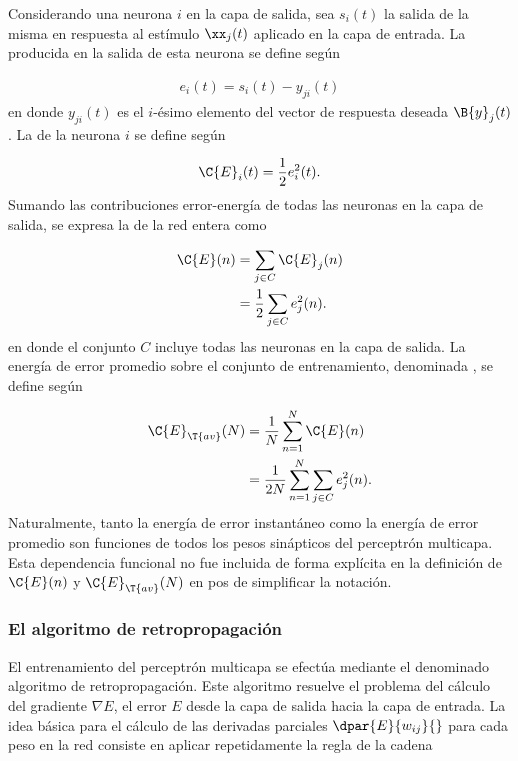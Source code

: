 Considerando una neurona $i$ en la capa de salida, sea $s_i(t)$ la
salida de la misma en respuesta al estímulo $\xx_j(t)$ aplicado en la
capa de entrada. La  producida en la salida de esta
neurona se define según

\begin{align}
\label{4.2}
  e_i(t)=s_{i}(t)-y_{ji}(t)
\end{align}
en donde $y_{ji}(t)$ es el $i$-ésimo elemento del vector de respuesta
deseada $\B{y}_j(t)$. La  de la neurona
$i$ se define según

\begin{align}
\label{4.3}
  \C{E}_i(t)=\frac{1}{2}e^2_i(t).
\end{align}
Sumando las contribuciones error-energía de todas las neuronas en la
capa de salida, se expresa la 
de la red entera como

\begin{align}
\label{4.4}
  \C{E}(n)&=\sum_{j\in C}\C{E}_j(n) \\
  &=\frac{1}{2}\sum_{j\in C}e^2_j(n).
\end{align}
en donde el conjunto $C$ incluye todas las neuronas en la capa de
salida. La energía de error promedio sobre el conjunto de entrenamiento,
denominada , se define según

\begin{align}
\label{4.5}
  \C{E}_{\T{av}}(N)&=\frac{1}{N}\sum_{n=1}^N\C{E}(n) \\
  &=\frac{1}{2N} \sum_{n=1}^N \sum_{j\in C}e^2_j(n).
\end{align}
Naturalmente, tanto la energía de error instantáneo como la energía de
error promedio son funciones de todos los pesos sinápticos del
perceptrón multicapa. Esta dependencia funcional no fue incluida de
forma explícita en la definición de $\C{E}(n)$ y $\C{E}_{\T{av}}(N)$
en pos de simplificar la notación.

\subsubsection{El algoritmo de retropropagación}
El entrenamiento del perceptrón multicapa se efectúa mediante el denominado
algoritmo de retropropagación.
Este algoritmo resuelve el problema del cálculo del gradiente
$\nabla E$,  el error $E$ desde la capa de salida hacia la
capa de entrada. La idea básica para el cálculo de las derivadas
parciales $\dpar{E}{w_{ij}}{}$ para cada peso en la red consiste en
aplicar repetidamente la regla de la cadena

